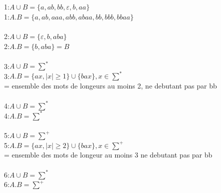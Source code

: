 \documentclass{article}
\begin{document}
\section{ }
1:$A\cup B = \{a,ab,bb,\varepsilon, b, aa\} $\\
1:$A.B = \{a,ab,aaa,abb,abaa,bb,bbb,bbaa\}$\\
\\
2:$A\cup B = \{\varepsilon, b, aba\} $\\
2:$A.B = \{b,aba\} = B$\\
\\
3:$A\cup B = \sum^*$\\
3:$A.B = \{ax, |x|\geq 1\} \cup \{bax\}, x\in \sum^* $\\
= ensemble des mots de longeurs au moins 2, ne debutant pas par bb\\
\\
4:$A\cup B = \sum^*$\\
4:$A.B = \sum^*$\\
\\
5:$A\cup B = \sum^+$\\
5:$A.B = \{ax, |x|\geq 2\} \cup \{bax\}, x\in \sum^+ $\\
= ensemble des mots de longeur au moins 3 ne debutant pas par bb\\
\\
6:$A\cup B = \sum^*$\\
6:$A.B = \sum^+ $\\
\\
\end{document}
